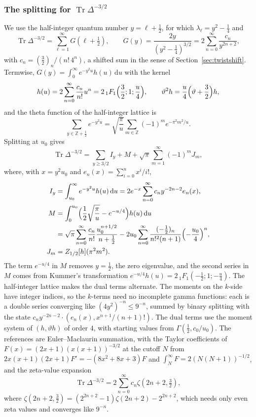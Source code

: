 \documentclass[11pt,reqno]{amsart}
\theoremstyle{definition}
\theoremstyle{remark}
\newcommand{\dd}{\,\mathrm{d}}
\newcommand{\ZZ}{\mathbb{Z}}
\begin{document}
\subsubsection{\texorpdfstring{The splitting for $\operatorname{Tr}\Delta^{-3/2}$}{The splitting for the trace}} We use the half-integer quantum number $y = \ell+\frac12$,
for which $\lambda_\ell = y^2-\frac14$ and
\[
  \operatorname{Tr}\Delta^{-3/2} = \sum_{\ell=1}^{\infty}G(\ell+\tfrac12), \qquad
  G(y) = \frac{2y}{(y^2-\frac14)^{3/2}} = 2\sum_{n=0}^{\infty}\frac{c_n}{y^{2n+2}},
\]
with $c_n = (\frac32)_n/(n!\,4^n)$, a shifted sum in the sense of Section~\ref{sec:twistshift}. Termwise, $G(y) = \int_0^\infty e^{-y^2u}h(u)\dd u$ with the
kernel
\[
  h(u) = 2\sum_{n=0}^{\infty}\frac{c_n}{n!}u^n = 2\,{}_1F_1\Bigl(\frac32;1;\frac u4\Bigr), \qquad
  \vartheta^2h = \frac u4\Bigl(\vartheta+\frac32\Bigr)h,
\]
and the theta function of the half-integer lattice is
\[
  \sum_{y\in\ZZ+\frac12}e^{-y^2u} = \sqrt{\frac\pi u}\sum_{m\in\ZZ}(-1)^me^{-\pi^2m^2/u}.
\]
Splitting at $u_0$ gives
\[
  \operatorname{Tr}\Delta^{-3/2} = \sum_{y\ge3/2}I_y + M + \sqrt\pi\sum_{m=1}^{\infty}(-1)^mJ_m,
\]
where, with $x = y^2u_0$ and $e_n(x) = \sum_{i=0}^{n}x^i/i!$,
\begin{align*}
  I_y &= \int_{u_0}^\infty e^{-y^2u}h(u)\dd u = 2e^{-x}\sum_{n=0}^{\infty}c_ny^{-2n-2}e_n(x), \\
  M &= \int_0^{u_0}\Bigl(\frac12\sqrt{\frac\pi u} - e^{-u/4}\Bigr)h(u)\dd u \\
    &= \sqrt\pi\sum_{n=0}^{\infty}\frac{c_n}{n!}\frac{u_0^{n+1/2}}{n+\frac12}
       - 2u_0\sum_{n=0}^{\infty}\frac{(-\frac12)_n}{n!^2(n+1)}\Bigl(-\frac{u_0}4\Bigr)^n, \\
  J_m &= Z_{1/2}[h](\pi^2m^2).
\end{align*}
The term $e^{-u/4}$ in $M$ removes $y = \frac12$, the zero eigenvalue, and the second series in $M$ comes from Kummer's
transformation $e^{-u/4}h(u) = 2\,{}_1F_1(-\frac12;1;-\frac u4)$. The half-integer lattice makes the dual terms
alternate. The moments on the $k$-side have integer indices, so the $k$-terms need no incomplete gamma functions: each
is a double series converging like $(4y^2)^{-n} \le 9^{-n}$, summed by binary splitting with the
state $c_ny^{-2n-2}\cdot(e_n(x), x^{n+1}/(n+1)!)$. The dual terms use the moment system of $(h, \vartheta h)$ of
order $4$, with starting values from $\Gamma(\frac12, c_0/u_0)$. The references are Euler--Maclaurin summation, with the
Taylor coefficients of $F(x) = (2x+1)(x(x+1))^{-3/2}$ at the cutoff $N$ from $2x(x+1)(2x+1)F' = -(8x^2+8x+3)F$ and
$\int_N^\infty F = 2(N(N+1))^{-1/2}$, and the zeta-value expansion
\[
  \operatorname{Tr}\Delta^{-3/2} = 2\sum_{n=0}^{\infty}c_n\zeta(2n+2,\tfrac32),
\]
where $\zeta(2n+2,\frac32) = (2^{2n+2}-1)\zeta(2n+2) - 2^{2n+2}$, which needs only even zeta values and converges like
$9^{-n}$.
\end{document}
